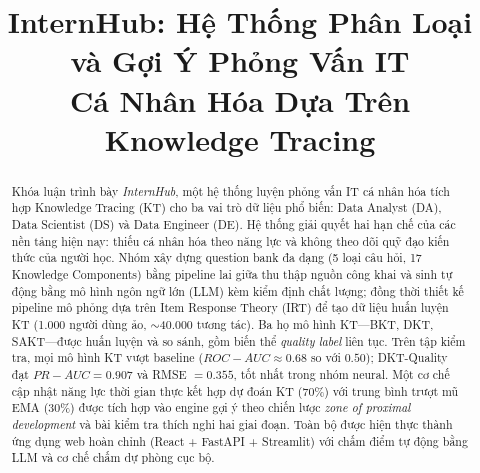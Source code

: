 \documentclass[conference]{IEEEtran}
\newcommand{\sys}{\textit{InternHub}}
\newcommand{\auc}{ROC-AUC}
\newcommand{\prauc}{PR-AUC}
\begin{document}
\title{InternHub: Hệ Thống Phân Loại và Gợi Ý Phỏng Vấn IT\\ Cá Nhân Hóa Dựa Trên Knowledge Tracing}

\author{
  \and
  \and
  \and
}

\maketitle

\begin{abstract}
Khóa luận trình bày \sys{}, một hệ thống luyện phỏng vấn IT cá nhân hóa tích hợp Knowledge Tracing (KT) cho ba vai trò dữ liệu phổ biến: Data Analyst (DA), Data Scientist (DS) và Data Engineer (DE). Hệ thống giải quyết hai hạn chế của các nền tảng hiện nay: thiếu cá nhân hóa theo năng lực và không theo dõi quỹ đạo kiến thức của người học. Nhóm xây dựng question bank đa dạng (5 loại câu hỏi, 17 Knowledge Components) bằng pipeline lai giữa thu thập nguồn công khai và sinh tự động bằng mô hình ngôn ngữ lớn (LLM) kèm kiểm định chất lượng; đồng thời thiết kế pipeline mô phỏng dựa trên Item Response Theory (IRT) để tạo dữ liệu huấn luyện KT (1.000 người dùng ảo, $\sim$40.000 tương tác). Ba họ mô hình KT---BKT, DKT, SAKT---được huấn luyện và so sánh, gồm biến thể \textit{quality label} liên tục. Trên tập kiểm tra, mọi mô hình KT vượt baseline ($\auc \approx 0.68$ so với $0.50$); DKT-Quality đạt $\prauc = 0.907$ và RMSE $= 0.355$, tốt nhất trong nhóm neural. Một cơ chế cập nhật năng lực thời gian thực kết hợp dự đoán KT (70\%) với trung bình trượt mũ EMA (30\%) được tích hợp vào engine gợi ý theo chiến lược \textit{zone of proximal development} và bài kiểm tra thích nghi hai giai đoạn. Toàn bộ được hiện thực thành ứng dụng web hoàn chỉnh (React + FastAPI + Streamlit) với chấm điểm tự động bằng LLM và cơ chế chấm dự phòng cục bộ.
\end{abstract}
\end{document}
